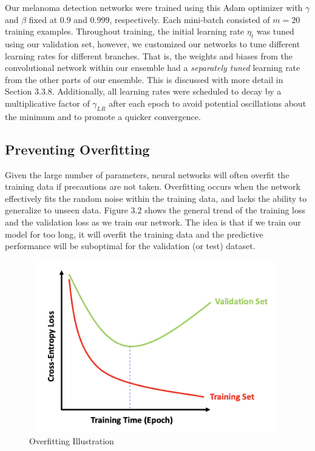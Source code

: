 \documentclass [MAS] {uclathes}
\begin{document}
Our melanoma detection networks were trained using this Adam optimizer with $\gamma$ and $\beta$ fixed at $0.9$ and $0.999$, respectively. Each mini-batch consisted of $m=20$ training examples.  Throughout training, the initial learning rate $\eta_t$ was tuned using our validation set, however, we customized our networks to tune different learning rates for different branches. That is, the weights and biases from the convolutional network within our ensemble had a \textit{separately tuned} learning rate from the other parts of our ensemble. This is discussed with more detail in Section 3.3.8. Additionally, all learning rates were scheduled to decay by a multiplicative factor of $\gamma_{LR}$ after each epoch to avoid potential oscillations about the minimum and to promote a quicker convergence.

\subsection{Preventing Overfitting}

Given the large number of parameters, neural networks will often overfit the training data if precautions are not taken. Overfitting occurs when the network effectively fits the random noise within the training data, and lacks the ability to generalize to unseen data. Figure 3.2 shows the general trend of the training loss and the validation loss as we train our network. The idea is that if we train our model for too long, it will overfit the training data and the predictive performance will be suboptimal for the validation (or test) dataset. 

\begin{figure}[h]
\centering
\includegraphics[height = 75mm, width=110mm]{imgs/overfitting.png}
\caption{Overfitting Illustration}
\label{fig:ovfit}
\end{figure}
\end{document}
